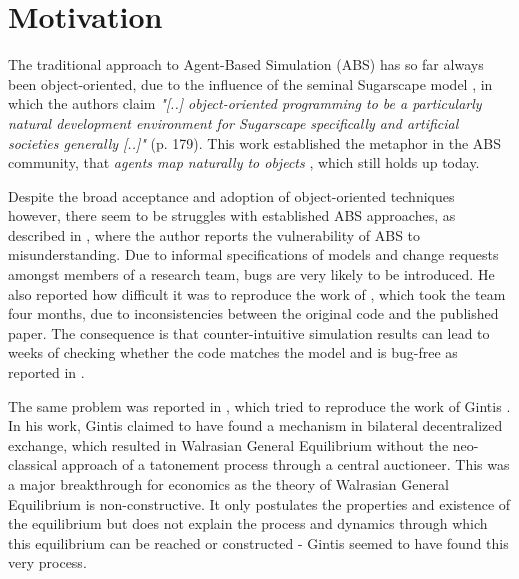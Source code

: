 \chapter{Motivation}
\label{ch:motivation}
The traditional approach to Agent-Based Simulation (ABS) has so far always been object-oriented, due to the influence of the seminal Sugarscape model \cite{epstein_growing_1996}, in which the authors claim \textit{"[..] object-oriented programming to be a particularly natural development environment for Sugarscape specifically and artificial societies generally [..]"} (p. 179). This work established the metaphor in the ABS community, that \textit{agents map naturally to objects} \cite{north_managing_2007}, which still holds up today.

Despite the broad acceptance and adoption of object-oriented techniques however, there seem to be struggles with established ABS approaches, as described in \cite{axelrod_chapter_2006}, where the author reports the vulnerability of ABS to misunderstanding. Due to informal specifications of models and change requests amongst members of a research team, bugs are very likely to be introduced. He also reported how difficult it was to reproduce the work of \cite{axelrod_convergence_1995}, which took the team four months, due to inconsistencies between the original code and the published paper. The consequence is that counter-intuitive simulation results can lead to weeks of checking whether the code matches the model and is bug-free as reported in \cite{axelrod_advancing_1997}.

The same problem was reported in \cite{ionescu_dependently-typed_2012}, which tried to reproduce the work of Gintis \cite{gintis_emergence_2006}. In his work, Gintis claimed to have found a mechanism in bilateral decentralized exchange, which resulted in Walrasian General Equilibrium without the neo-classical approach of a tatonement process through a central auctioneer. This was a major breakthrough for economics as the theory of Walrasian General Equilibrium is non-constructive. It only postulates the properties and existence of the equilibrium \cite{colell_microeconomic_1995} but does not explain the process and dynamics through which this equilibrium can be reached or constructed - Gintis seemed to have found this very process.

